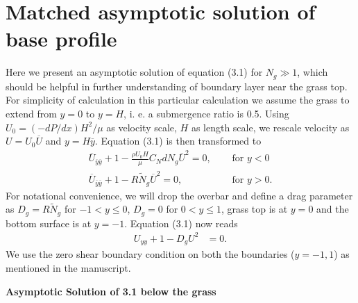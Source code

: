 \documentclass[12pt]{report}   %
\newcommand{\Ndg}{\tilde{N}_g}
\renewcommand{\bar}{\overline}
\begin{document}
\chapter{Matched asymptotic solution of base profile}
Here we present an asymptotic solution of equation (3.1) for $N_g \gg 1$, which should be helpful in further understanding of boundary layer near the grass top. For simplicity of calculation in this particular calculation we assume the grass to extend from $y=0$ to $y=H$, i. e. a submergence ratio is 0.5. 
Using $ U_0 = (-dP/dx)H^2/\mu$ as velocity scale, $H$ as length scale, we rescale velocity as $U= U_0 \bar{U}$ and $y = H \bar{y}$. Equation (3.1) is then transformed to  
\begin{equation}
\begin{split}
 \bar{U}_{\bar{y}\bar{y}}+1 - \frac{\rho U_0 H}{\mu} C_N d N_g \bar{U}^2 =0, \quad &\text{ for } y<0\\
 \bar{U}_{\bar{y}\bar{y}}+1 - R \Ndg \bar{U}^2=0, \quad &\text{ for } y>0.
\end{split}
\end{equation}
For notational convenience, we will drop the overbar and define a drag parameter as $D_g = R\Ndg$ for $-1<y\le 0$, $D_g = 0$ for $0<y\le 1$, grass top is at $y=0$ and the bottom surface is at $y=-1$. Equation (3.1) now reads
\begin{equation}
\begin{split}
 {U}_{{y}{y}}+1 - D_g{U}^2 &=0.
\end{split}
\end{equation}
We use the zero shear boundary condition on both the boundaries ($y=-1,1$) as mentioned in the manuscript.

\vspace{2mm}
\noindent
\textbf{Asymptotic Solution of 3.1 below the grass}
\end{document}
